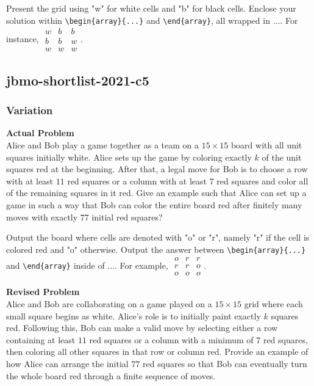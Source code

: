 Present the grid using "w" for white cells and "b" for black cells. Enclose your solution within \verb|\begin{array}{...}| and \verb|\end{array}|, all wrapped in $\boxed{...}$. For instance, $\boxed{\begin{array}{ccc}w & b & b \\ b & b & w \\ w & w & w\end{array}}$.

\subsection{jbmo-shortlist-2021-c5}
\subsubsection{Variation}
\textbf{Actual Problem}\\
Alice and Bob play a game together as a team on a $15 \times 15$ board with all unit squares initially white. Alice sets up the game by coloring exactly $k$ of the unit squares red at the beginning. After that, a legal move for Bob is to choose a row with at least $11$ red squares or a column with at least $7$ red squares and color all of the remaining squares in it red. Give an example such that Alice can set up a game in such a way that Bob can color the entire board red after finitely many moves with exactly $77$ initial red squares?

Output the board where cells are denoted with "o" or "r", namely "r" if the cell is colored red and "o" otherwise. Output the answer between \verb|\begin{array}{...}| and \verb|\end{array}| inside of $\boxed{...}$. For example, $\boxed{\begin{array}{ccc}o & r & r \\ r & r & o \\ o & o & o\end{array}}$.

\textbf{Revised Problem}\\
Alice and Bob are collaborating on a game played on a $15 \times 15$ grid where each small square begins as white. Alice's role is to initially paint exactly $k$ squares red. Following this, Bob can make a valid move by selecting either a row containing at least $11$ red squares or a column with a minimum of $7$ red squares, then coloring all other squares in that row or column red. Provide an example of how Alice can arrange the initial $77$ red squares so that Bob can eventually turn the whole board red through a finite sequence of moves.

